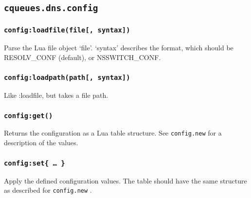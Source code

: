 \documentclass[11pt, oneside]{memoir}
\newcommand{\fn}[1]{\texttt{#1} }
\newcounter{toccols}
\newenvironment{Module}[1]{
	\subsection{\texttt{#1}}
	\addtocontents{toc}{
		\protect\begin{multicols}{\value{toccols}}
	}
}{
	\addtocontents{toc}{\protect\end{multicols}}
}
\begin{document}
\begin{Module}{cqueues.dns.config}
\subsubsection[\fn{config:loadfile}]{\fn{config:loadfile(file[, syntax])}}

Parse the Lua file object `file'. `syntax' describes the format, which should be RESOLV\_CONF (default), or NSSWITCH\_CONF.

\subsubsection[\fn{config:loadpath}]{\fn{config:loadpath(path[, syntax])}}

Like :loadfile, but takes a file path.

\subsubsection[\fn{config:get}]{\fn{config:get()}}

Returns the configuration as a Lua table structure. See \fn{config.new} for a description of the values.

\subsubsection[\fn{config:set}]{\fn{config:set\{ … \}}}

Apply the defined configuration values. The table should have the same structure as described for \fn{config.new}.

\end{Module}
\end{document}
